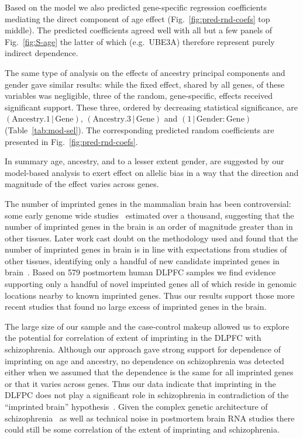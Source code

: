 \documentclass[letterpaper]{article}
\begin{document}
Based on the model we also predicted
gene-specific regression coefficients mediating the direct component of age
effect (Fig.~\ref{fig:pred-rnd-coefs} top middle).  The predicted coefficients
agreed well with all but a few panels of Fig.~\ref{fig:S-age} the latter of
which (e.g.~UBE3A) therefore represent purely indirect dependence.

The same type of analysis on the effects of ancestry principal components and
gender gave similar results: while the fixed effect, shared by all genes, of
these variables was negligible, three of the random, gene-specific, effects
received significant support.  These three, ordered by decreasing
statistical significance, are
\((\mathrm{Ancestry.1}\,|\,\mathrm{Gene})\),
\((\mathrm{Ancestry.3}\,|\,\mathrm{Gene})\) and
\((1\,|\,\mathrm{Gender}:\mathrm{Gene})\) (Table~\ref{tab:mod-sel}).  The
corresponding predicted random coefficients are presented in
Fig.~\ref{fig:pred-rnd-coefs}.

In summary age, ancestry, and to a lesser extent gender, are suggested by our
model-based analysis to exert effect on allelic bias in a way that the
direction and magnitude of the effect varies across genes.

The number of imprinted genes in the mammalian brain has been controversial:
some early genome wide studies~\cite{Gregg2010a,Gregg2010} estimated over a
thousand, suggesting that the number of imprinted genes in the brain is an
order of magnitude greater than in other tissues.  Later work cast doubt on
the methodology used and found that the number of imprinted genes in brain is
in line with expectations from studies of other tissues, identifying only a
handful of new candidate imprinted genes in brain~\cite{Baran2015,DeVeale2012,Perez2015}.
Based on 579 postmortem human DLPFC
samples we find evidence supporting only a handful of novel imprinted genes
all of which reside in genomic locations nearby to known imprinted genes.
Thus our results support those more recent studies that found no large excess
of imprinted genes in the brain.

The large size of our sample and the case-control makeup allowed us to explore
the potential for correlation of extent of imprinting in the DLPFC with
schizophrenia.  Although our approach gave strong support for dependence of
imprinting on age and ancestry, no dependence on schizophrenia was detected
either when we assumed that the dependence is the same for all imprinted genes
or that it varies across genes.  Thus our data indicate that imprinting in the
DLFPC does not play a significant role in schizophrenia in contradiction of
the ``imprinted brain'' hypothesis~\cite{Crespi2008}.  Given the complex
genetic architecture of schizophrenia~\cite{Sullivan2012} as well as technical
noise in postmortem brain RNA studies there could still be some correlation of
the extent of imprinting and schizophrenia.
\end{document}
